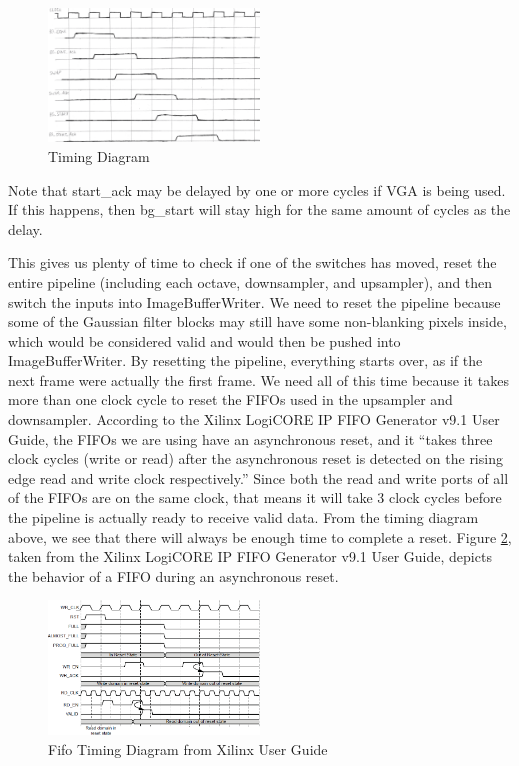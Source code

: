 \begin{figure}
    \includegraphics[width=0.5\textwidth]{processed_image_pngs/timing_3.png}
    \caption{Timing Diagram}
    \label{fig:timing_3}
\end{figure}


Note that start\_ack may be delayed by one or more cycles if VGA is being used. If this happens, then bg\_start will stay high for the same amount of cycles as the delay.

This gives us plenty of time to check if one of the switches has moved, reset 
the entire pipeline (including each octave, downsampler, and upsampler), and 
then switch the inputs into ImageBufferWriter. We need to reset the pipeline 
because some of the Gaussian filter blocks may still have some non-blanking 
pixels inside, which would be considered valid and would then be pushed into 
ImageBufferWriter. By resetting the pipeline, everything starts over, as if the 
next frame were actually the first frame. We need all of this time because it 
takes more than one clock cycle to reset the FIFOs used in the upsampler and 
downsampler. According to the Xilinx LogiCORE IP FIFO Generator v9.1 User Guide, 
the FIFOs we are using have an asynchronous reset, and it ``takes three clock 
cycles (write or read) after the asynchronous reset is detected on the rising 
edge read and write clock respectively.'' Since both the read and write ports 
of all of the FIFOs are on the same clock, that means it will take 3 clock 
cycles before the pipeline is actually ready to receive valid data. From the 
timing diagram above, we see that there will always be enough time to complete 
a reset. Figure \ref{fig:fifo_timing}, taken from the Xilinx LogiCORE IP FIFO Generator 
v9.1 User Guide, depicts the behavior of a FIFO during an asynchronous reset.

\begin{figure}
    \includegraphics[width=0.5\textwidth]{processed_image_pngs/fifo_timing.png}
    \caption{Fifo Timing Diagram from Xilinx User Guide}
    \label{fig:fifo_timing}
\end{figure}



